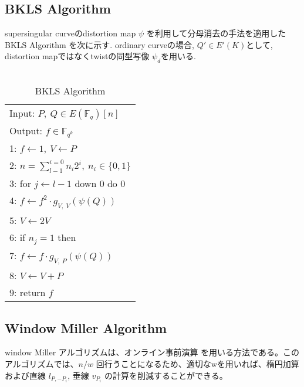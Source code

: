\documentclass[twocolumn]{jsarticle} %
\begin{document}
\vspace{-5mm}
\subsection{BKLS Algorithm}
 supersingular curveのdistortion map $\psi$ を利用して分母消去の手法を適用したBKLS Algorithm \cite{BKLS02}を次に示す. ordinary curveの場合, $Q' \in E'(K)$として, distortion mapではなくtwistの同型写像 $\psi _d$を用いる. \\\\

\begin{table}[h]
 \begin{center}
  \begin{tabular}{|l|}
     \hline
 Input: $P,\ Q \in E(\mathbb{F}_q)[n]$\\
 Output: $f \in \mathbb{F}_{q^k} $\\
     \hline
 1: \quad $f \gets 1,\ V \gets P$\\
 2: \quad $n=\sum_{l-1}^{i=0} n_i 2^i, \ n_i \in \{0,1\}$\\
 3: \quad for $j \gets l-1$ down 0 do 0\\
 4: \quad \quad $f \gets f^2 \cdot g_{V,\ V}(\psi (Q))$\\
 5: \quad \quad $V \gets 2V$\\
 6: \quad if $n_j = 1$ then\\
 7: \quad \quad $f \gets f \cdot g_{V,\ P}(\psi (Q))$\\
 8: \quad \quad $V \gets V+P$\\
 9: \quad return $f$\\
     \hline
   \end{tabular}
 \end{center}
 \caption{BKLS Algorithm}
\end{table}
\vspace{-8mm}
\par

\subsection{Window Miller Algorithm}

window Miller アルゴリズムは、オンライン事前演算 を用いる方法である。このアルゴリズムでは、$n/w$ 回行うことになるため、適切なwを用いれば、楕円加算および直線 $l _{P, -P_i}$, 垂線 $v _{P_i}$ の計算を削減することができる。
\par
\end{document}

